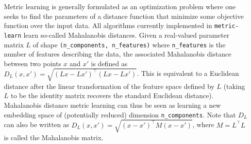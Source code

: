 \documentclass[twoside,11pt]{article}
\begin{document}
Metric learning is generally formulated as an optimization problem where one seeks to find the parameters of a distance function that minimize some objective function over the input data.
All algorithms currently implemented in \texttt{metric-learn} learn so-called Mahalanobis distances. Given a real-valued parameter matrix $L$ of shape \texttt{(n\_components, n\_features)} where \texttt{n\_features} is the
number of features describing the data, the associated Mahalanobis distance between two points $x$ and $x'$ is defined as $D_L(x, x') = \sqrt{(Lx-Lx')^\top(Lx-Lx')}$.
This is equivalent to a Euclidean distance after the linear transformation of the feature space defined by $L$ (taking $L$ to be the identity matrix recovers the standard Euclidean distance).
Mahalanobis distance metric learning can thus be seen as learning a new
embedding space of (potentially reduced) dimension \texttt{n\_components}.
Note that $D_L$ can also be written as $D_L(x, x') = \sqrt{(x - x')^\top M (x - x')}$, where $M = L^\top L$ is called the Mahalanobis matrix.




\end{document}
